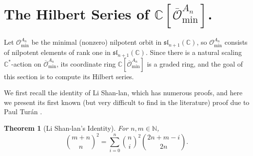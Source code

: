 \documentclass[12pt]{extarticle}
\theoremstyle{plain}
\newtheorem{theo}{Theorem}[section]
\theoremstyle{definition}
\theoremstyle{remark}
\newcommand{\Omin}{\mathcal{O}_{\textrm{min}}}
\newcommand{\Ominbar}{\overline{\mathcal{O}}_\textrm{min}}
\newcommand{\slnn}{\mathfrak{sl}_{n+1}}
\newcommand{\N}{\mathbb{N}}
\newcommand{\C}{\mathbb{C}}
\begin{document}
\section{The Hilbert Series of $\C[\Ominbar^{A_n}]$.}
Let $\Omin^{A_n}$ be the minimal (nonzero) nilpotent orbit in $\slnn(\C)$, so $\Omin^{A_n}$ consists of nilpotent elements of rank one in $\slnn(\C)$. Since there is a natural scaling $\C^*$-action on $\Ominbar^{A_n}$, its coordinate ring $\C[\Ominbar^{A_n}]$ is a graded ring, and the goal of this section is to compute its Hilbert series.

We first recall the identity of Li Shan-lan, which has numerous proofs, and here we present its first known (but very difficult to find in the literature) proof due to Paul Tur\'an \cite{Turan}.
\begin{theo}[Li Shan-lan's Identity]\label{Li} For $n,m\in\N$,
$$
    \binom{m+n}{n}^2=\sum_{i=0}^{n}\binom{n}{i}^2\binom{2n+m-i}{2n}.
$$
\end{theo}
\end{document}

